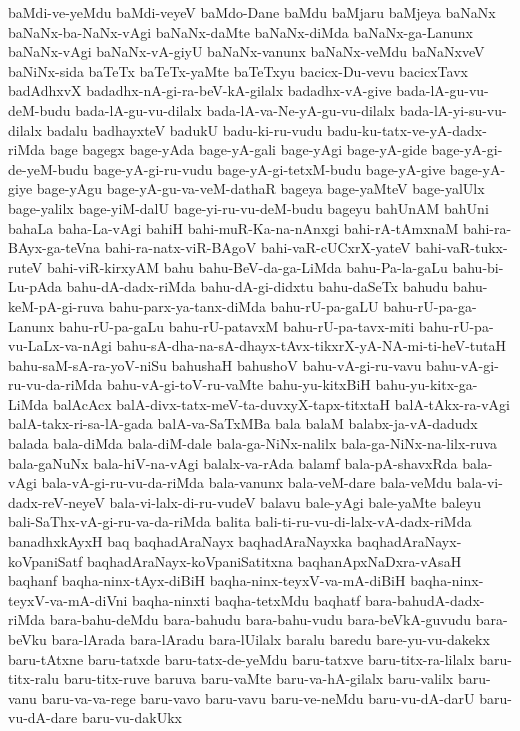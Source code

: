 {baMdi-ve-yeMdu
baMdi-veyeV
baMdo-Dane
baMdu
baMjaru
baMjeya
baNaNx
baNaNx-ba-NaNx-vAgi
baNaNx-daMte
baNaNx-diMda
baNaNx-ga-Lanunx
baNaNx-vAgi
baNaNx-vA-giyU
baNaNx-vanunx
baNaNx-veMdu
baNaNxveV
baNiNx-sida
baTeTx
baTeTx-yaMte
baTeTxyu
bacicx-Du-vevu
bacicxTavx
badAdhxvX
badadhx-nA-gi-ra-beV-kA-gilalx
badadhx-vA-give
bada-lA-gu-vu-deM-budu
bada-lA-gu-vu-dilalx
bada-lA-va-Ne-yA-gu-vu-dilalx
bada-lA-yi-su-vu-dilalx
badalu
badhayxteV
badukU
badu-ki-ru-vudu
badu-ku-tatx-ve-yA-dadx-riMda
bage
bagegx
bage-yAda
bage-yA-gali
bage-yAgi
bage-yA-gide
bage-yA-gi-de-yeM-budu
bage-yA-gi-ru-vudu
bage-yA-gi-tetxM-budu
bage-yA-give
bage-yA-giye
bage-yAgu
bage-yA-gu-va-veM-dathaR
bageya
bage-yaMteV
bage-yalUlx
bage-yalilx
bage-yiM-dalU
bage-yi-ru-vu-deM-budu
bageyu
bahUnAM
bahUni
bahaLa
baha-La-vAgi
bahiH
bahi-muR-Ka-na-nAnxgi
bahi-rA-tAmxnaM
bahi-ra-BAyx-ga-teVna
bahi-ra-natx-viR-BAgoV
bahi-vaR-cUCxrX-yateV
bahi-vaR-tukx-ruteV
bahi-viR-kirxyAM
bahu
bahu-BeV-da-ga-LiMda
bahu-Pa-la-gaLu
bahu-bi-Lu-pAda
bahu-dA-dadx-riMda
bahu-dA-gi-didxtu
bahu-daSeTx
bahudu
bahu-keM-pA-gi-ruva
bahu-parx-ya-tanx-diMda
bahu-rU-pa-gaLU
bahu-rU-pa-ga-Lanunx
bahu-rU-pa-gaLu
bahu-rU-patavxM
bahu-rU-pa-tavx-miti
bahu-rU-pa-vu-LaLx-va-nAgi
bahu-sA-dha-na-sA-dhayx-tAvx-tikxrX-yA-NA-mi-ti-heV-tutaH
bahu-saM-sA-ra-yoV-niSu
bahushaH
bahushoV
bahu-vA-gi-ru-vavu
bahu-vA-gi-ru-vu-da-riMda
bahu-vA-gi-toV-ru-vaMte
bahu-yu-kitxBiH
bahu-yu-kitx-ga-LiMda
balAcAcx
balA-divx-tatx-meV-ta-duvxyX-tapx-titxtaH
balA-tAkx-ra-vAgi
balA-takx-ri-sa-lA-gada
balA-va-SaTxMBa
bala
balaM
balabx-ja-vA-dadudx
balada
bala-diMda
bala-diM-dale
bala-ga-NiNx-nalilx
bala-ga-NiNx-na-lilx-ruva
bala-gaNuNx
bala-hiV-na-vAgi
balalx-va-rAda
balamf
bala-pA-shavxRda
bala-vAgi
bala-vA-gi-ru-vu-da-riMda
bala-vanunx
bala-veM-dare
bala-veMdu
bala-vi-dadx-reV-neyeV
bala-vi-lalx-di-ru-vudeV
balavu
bale-yAgi
bale-yaMte
baleyu
bali-SaThx-vA-gi-ru-va-da-riMda
balita
bali-ti-ru-vu-di-lalx-vA-dadx-riMda
banadhxkAyxH
baq
baqhadAraNayx
baqhadAraNayxka
baqhadAraNayx-koVpaniSatf
baqhadAraNayx-koVpaniSatitxna
baqhanApxNaDxra-vAsaH
baqhanf
baqha-ninx-tAyx-diBiH
baqha-ninx-teyxV-va-mA-diBiH
baqha-ninx-teyxV-va-mA-diVni
baqha-ninxti
baqha-tetxMdu
baqhatf
bara-bahudA-dadx-riMda
bara-bahu-deMdu
bara-bahudu
bara-bahu-vudu
bara-beVkA-guvudu
bara-beVku
bara-lArada
bara-lAradu
bara-lUilalx
baralu
baredu
bare-yu-vu-dakekx
baru-tAtxne
baru-tatxde
baru-tatx-de-yeMdu
baru-tatxve
baru-titx-ra-lilalx
baru-titx-ralu
baru-titx-ruve
baruva
baru-vaMte
baru-va-hA-gilalx
baru-valilx
baru-vanu
baru-va-va-rege
baru-vavo
baru-vavu
baru-ve-neMdu
baru-vu-dA-darU
baru-vu-dA-dare
baru-vu-dakUkx
}
